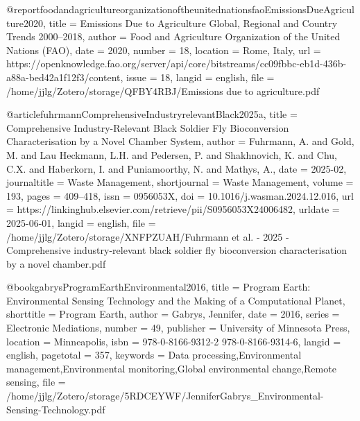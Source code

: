 {{{@report{foodandagricultureorganizationoftheunitednationsfaoEmissionsDueAgriculture2020,
  title = {Emissions Due to Agriculture {{Global}}, Regional and Country Trends 2000–2018},
  author = {{Food and Agriculture Organization of the United Nations (FAO)}},
  date = {2020},
  number = {18},
  location = {Rome, Italy},
  url = {https://openknowledge.fao.org/server/api/core/bitstreams/cc09fbbc-eb1d-436b-a88a-bed42a1f12f3/content},
  issue = {18},
  langid = {english},
  file = {/home/jjlg/Zotero/storage/QFBY4RBJ/Emissions due to agriculture.pdf}
}

@article{fuhrmannComprehensiveIndustryrelevantBlack2025a,
  title = {Comprehensive Industry-Relevant Black Soldier Fly Bioconversion Characterisation by a Novel Chamber System},
  author = {Fuhrmann, A. and Gold, M. and Lau Heckmann, L.H. and Pedersen, P. and Shakhnovich, K. and Chu, C.X. and Haberkorn, I. and Puniamoorthy, N. and Mathys, A.},
  date = {2025-02},
  journaltitle = {Waste Management},
  shortjournal = {Waste Management},
  volume = {193},
  pages = {409--418},
  issn = {0956053X},
  doi = {10.1016/j.wasman.2024.12.016},
  url = {https://linkinghub.elsevier.com/retrieve/pii/S0956053X24006482},
  urldate = {2025-06-01},
  langid = {english},
  file = {/home/jjlg/Zotero/storage/XNFPZUAH/Fuhrmann et al. - 2025 - Comprehensive industry-relevant black soldier fly bioconversion characterisation by a novel chamber.pdf}
}

@book{gabrysProgramEarthEnvironmental2016,
  title = {Program Earth: Environmental Sensing Technology and the Making of a Computational Planet},
  shorttitle = {Program Earth},
  author = {Gabrys, Jennifer},
  date = {2016},
  series = {Electronic Mediations},
  number = {49},
  publisher = {University of Minnesota Press},
  location = {Minneapolis},
  isbn = {978-0-8166-9312-2 978-0-8166-9314-6},
  langid = {english},
  pagetotal = {357},
  keywords = {Data processing,Environmental management,Environmental monitoring,Global environmental change,Remote sensing},
  file = {/home/jjlg/Zotero/storage/5RDCEYWF/JenniferGabrys_Environmental-Sensing-Technology.pdf}
}

}}}
